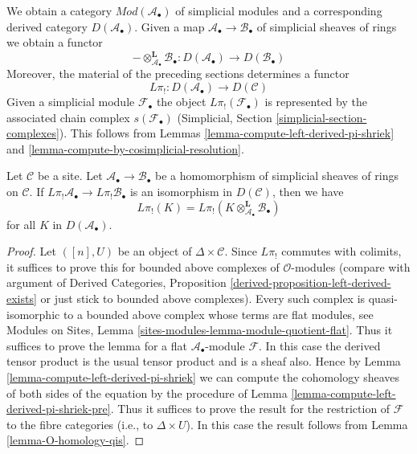 \noindent
We obtain a category $\textit{Mod}(\mathcal{A}_\bullet)$ of
simplicial modules and a corresponding derived category
$D(\mathcal{A}_\bullet)$. Given a map
$\mathcal{A}_\bullet \to \mathcal{B}_\bullet$ of simplicial sheaves
of rings we obtain a functor
$$
- \otimes^\mathbf{L}_{\mathcal{A}_\bullet} \mathcal{B}_\bullet :
D(\mathcal{A}_\bullet)
\longrightarrow
D(\mathcal{B}_\bullet)
$$
Moreover, the material of the preceding sections determines a functor
$$
L\pi_! : D(\mathcal{A}_\bullet) \longrightarrow D(\mathcal{C})
$$
Given a simplicial module $\mathcal{F}_\bullet$ the object
$L\pi_!(\mathcal{F}_\bullet)$ is represented by the associated
chain complex $s(\mathcal{F}_\bullet)$
(Simplicial, Section \ref{simplicial-section-complexes}).
This follows from 
Lemmas \ref{lemma-compute-left-derived-pi-shriek} and
\ref{lemma-compute-by-cosimplicial-resolution}.

\begin{lemma}
\label{lemma-base-change-by-qis}
Let $\mathcal{C}$ be a site. Let $\mathcal{A}_\bullet \to \mathcal{B}_\bullet$
be a homomorphism of simplicial sheaves of rings on $\mathcal{C}$.
If $L\pi_!\mathcal{A}_\bullet \to L\pi_!\mathcal{B}_\bullet$ is an
isomorphism in $D(\mathcal{C})$, then we have
$$
L\pi_!(K) =
L\pi_!(K \otimes^\mathbf{L}_{\mathcal{A}_\bullet} \mathcal{B}_\bullet)
$$
for all $K$ in $D(\mathcal{A}_\bullet)$.
\end{lemma}

\begin{proof}
Let $([n], U)$ be an object of $\Delta \times \mathcal{C}$. Since $L\pi_!$
commutes with colimits, it suffices to prove this for bounded above complexes
of $\mathcal{O}$-modules (compare with argument of
Derived Categories, Proposition \ref{derived-proposition-left-derived-exists}
or just stick to bounded above complexes). Every such complex is
quasi-isomorphic to a bounded above complex whose terms are flat modules, see
Modules on Sites, Lemma \ref{sites-modules-lemma-module-quotient-flat}.
Thus it suffices to prove the lemma for a flat $\mathcal{A}_\bullet$-module
$\mathcal{F}$. In this case the derived tensor product is the usual
tensor product and is a sheaf also. Hence by
Lemma \ref{lemma-compute-left-derived-pi-shriek}
we can compute the cohomology
sheaves of both sides of the equation by the procedure of
Lemma \ref{lemma-compute-left-derived-pi-shriek-pre}.
Thus it suffices to prove the result for the restriction of
$\mathcal{F}$ to the fibre categories (i.e., to $\Delta \times U$).
In this case the result follows from Lemma \ref{lemma-O-homology-qis}.
\end{proof}


